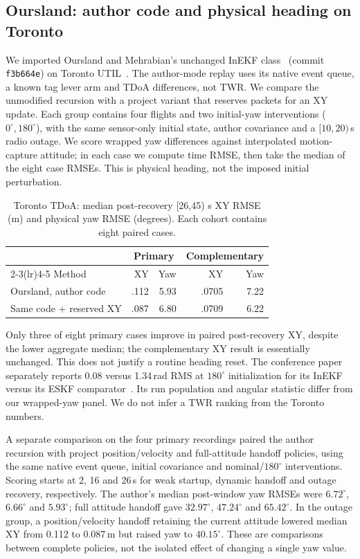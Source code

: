\documentclass[conference,letterpaper,10pt]{IEEEtran}
\begin{document}
\subsection{Oursland: author code and physical heading on Toronto}
We imported Oursland and Mehrabian's unchanged InEKF class~\cite{oursland} (commit \texttt{f3b664e}) on Toronto UTIL~\cite{util}. The author-mode replay uses its native event queue, a known tag lever arm and TDoA differences, not TWR. We compare the unmodified recursion with a project variant that reserves packets for an XY update. Each group contains four flights and two initial-yaw interventions ($0^\circ,180^\circ$), with the same sensor-only initial state, author covariance and a $[10,20)$\,s radio outage. We score wrapped yaw differences against interpolated motion-capture attitude; in each case we compute time RMSE, then take the median of the eight case RMSEs. This is physical heading, not the imposed initial perturbation.

\begin{table}[t]
\caption{Toronto TDoA: median post-recovery [26,45) s XY RMSE (m) and physical yaw RMSE (degrees). Each cohort contains eight paired cases.}
\label{tab:oursland}\centering\small
\begin{tabular}{lrrrr}
\toprule
&\multicolumn{2}{c}{Primary}&\multicolumn{2}{c}{Complementary}\\
\cmidrule(lr){2-3}\cmidrule(lr){4-5}
Method&XY&Yaw&XY&Yaw\\\midrule
Oursland, author code&.112&5.93&.0705&7.22\\
Same code + reserved XY&.087&6.80&.0709&6.22\\\bottomrule
\end{tabular}
\end{table}
Only three of eight primary cases improve in paired post-recovery XY, despite the lower aggregate median; the complementary XY result is essentially unchanged. This does not justify a routine heading reset. The conference paper separately reports 0.08 versus 1.34\,rad RMS at $180^\circ$ initialization for its InEKF versus its ESKF comparator~\cite{oursland}. Its run population and angular statistic differ from our wrapped-yaw panel. We do not infer a TWR ranking from the Toronto numbers.

A separate comparison on the four primary recordings paired the author recursion with project position/velocity and full-attitude handoff policies, using the same native event queue, initial covariance and nominal/$180^\circ$ interventions. Scoring starts at 2, 16 and 26\,s for weak startup, dynamic handoff and outage recovery, respectively. The author's median post-window yaw RMSEs were $6.72^\circ$, $6.66^\circ$ and $5.93^\circ$; full attitude handoff gave $32.97^\circ$, $47.24^\circ$ and $65.42^\circ$. In the outage group, a position/velocity handoff retaining the current attitude lowered median XY from 0.112 to 0.087\,m but raised yaw to $40.15^\circ$. These are comparisons between complete policies, not the isolated effect of changing a single yaw value.
\end{document}
